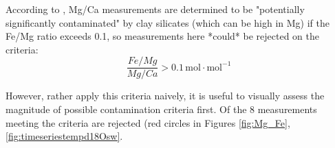 According to \citeauthor{barker2003study}\parencite{barker2003study}, Mg/Ca measurements are determined to be "potentially significantly contaminated" by clay silicates (which can be high in Mg) if the Fe/Mg ratio exceeds 0.1, so measurements here *could* be rejected on the criteria:
$$
\frac{Fe/Mg}{Mg/Ca} > 0.1 \, \mathrm{mol \cdot mol^{-1}}
$$

However, rather apply this criteria naively, it is useful to visually assess the magnitude of possible contamination criteria first.
Of the 8 measurements meeting the criteria are rejected (red circles in Figures \ref{fig:Mg_Fe}, \ref{fig:timeseriestempd18Osw}.
